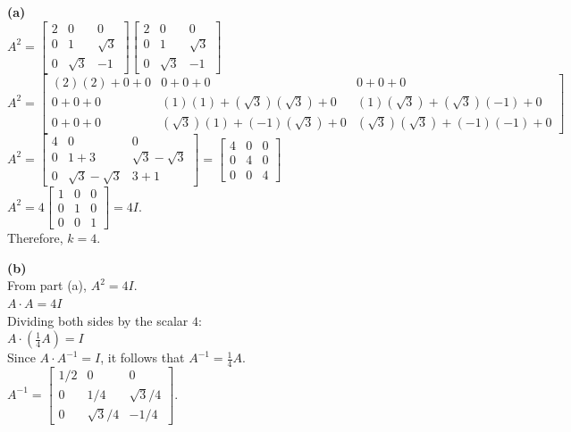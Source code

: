 \begin{solution}
\textbf{(a)} \\
$A^2 = \begin{bmatrix} 2 & 0 & 0 \\ 0 & 1 & \sqrt{3} \\ 0 & \sqrt{3} & -1 \end{bmatrix} \begin{bmatrix} 2 & 0 & 0 \\ 0 & 1 & \sqrt{3} \\ 0 & \sqrt{3} & -1 \end{bmatrix}$ \\
$A^2 = \begin{bmatrix} (2)(2)+0+0 & 0+0+0 & 0+0+0 \\ 0+0+0 & (1)(1)+(\sqrt{3})(\sqrt{3})+0 & (1)(\sqrt{3})+(\sqrt{3})(-1)+0 \\ 0+0+0 & (\sqrt{3})(1)+(-1)(\sqrt{3})+0 & (\sqrt{3})(\sqrt{3})+(-1)(-1)+0 \end{bmatrix}$ \\
$A^2 = \begin{bmatrix} 4 & 0 & 0 \\ 0 & 1+3 & \sqrt{3}-\sqrt{3} \\ 0 & \sqrt{3}-\sqrt{3} & 3+1 \end{bmatrix} = \begin{bmatrix} 4 & 0 & 0 \\ 0 & 4 & 0 \\ 0 & 0 & 4 \end{bmatrix}$ \\
$A^2 = 4 \begin{bmatrix} 1 & 0 & 0 \\ 0 & 1 & 0 \\ 0 & 0 & 1 \end{bmatrix} = 4I$. \\
Therefore, $k = 4$.

\medskip
\textbf{(b)} \\
From part (a), $A^2 = 4I$. \\
$A \cdot A = 4I$ \\
Dividing both sides by the scalar $4$: \\
$A \cdot \left(\frac{1}{4}A\right) = I$ \\
Since $A \cdot A^{-1} = I$, it follows that $A^{-1} = \frac{1}{4}A$. \\
$A^{-1} = \begin{bmatrix} 1/2 & 0 & 0 \\ 0 & 1/4 & \sqrt{3}/4 \\ 0 & \sqrt{3}/4 & -1/4 \end{bmatrix}$.


\end{solution}
